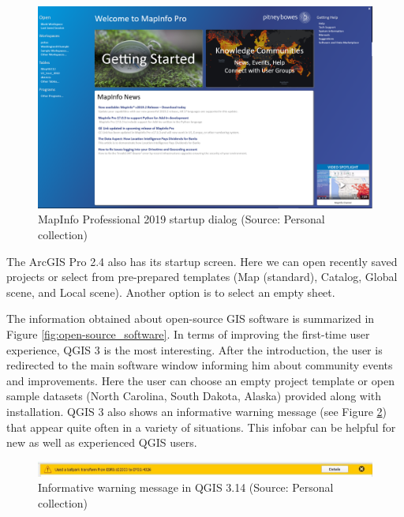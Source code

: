 \documentclass[a4paper,10pt,twoside]{article}
\begin{document}
\vspace{0.3cm}
\begin{figure}[hbt!] 
\begin{center}
\includegraphics[width=16cm]{../pictures/map_info_startup_screen.PNG} 
\caption[MapInfo Professional 2019 startup dialog]{MapInfo Professional 2019 startup dialog (Source: Personal collection)}
\label{fig:map_info_startup_screen}
\end{center}
\end{figure}

\noindent The ArcGIS Pro 2.4 also has its startup screen. Here we can
open recently saved projects or select from pre-prepared templates
(Map (standard), Catalog, Global scene, and Local scene). Another
option is to select an empty sheet.

The information obtained about open-source GIS software is summarized
in Figure \ref{fig:open-source_software}. In terms of improving the
first-time user experience, QGIS 3 is the most interesting. After the
introduction, the user is redirected to the main software window
informing him about community events and improvements. Here the user
can choose an empty project template or open sample datasets (North
Carolina, South Dakota, Alaska) provided along with installation. QGIS
3 also shows an informative warning message (see Figure
\ref{fig:qgis_warning_window}) that appear quite often in a variety of
situations. This infobar can be helpful for new as well as experienced
QGIS users.

\vspace{0.3cm}
\begin{figure}[hbt!] 
\begin{center}
\includegraphics[width=17cm]{../pictures/qgis_warning_window.JPG} 
\caption[Informative warning message  in QGIS 3.14]{Informative warning message  in QGIS 3.14 (Source: Personal collection)}
\label{fig:qgis_warning_window}
\end{center}
\end{figure}
\end{document}
